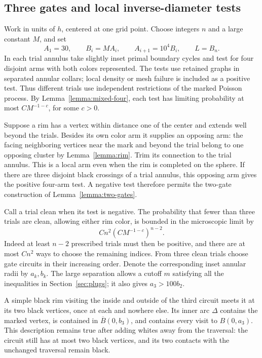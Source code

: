 \subsection{Three gates and local inverse-diameter tests}

Work in units of $h$, centered at one grid point.  Choose integers $n$
and a large constant $M$, and set
\[
 A_1=30,\qquad B_i=MA_i,\qquad A_{i+1}=10^4B_i,
 \qquad L=B_n.
\]
In each trial annulus take slightly inset primal boundary cycles and
test for four disjoint arms with both colors represented.  The tests use
retained graphs in separated annular collars; local density or mesh
failure is included as a positive test.  Thus different trials use
independent restrictions of the marked Poisson process.  By
Lemma~\ref{lemma:mixed-four}, each test has limiting probability at most
$CM^{-1-c}$, for some $c>0$.

Suppose a rim has a vertex within distance one of the center and extends
well beyond the trials.  Besides its own color arm it supplies an
opposing arm: the facing neighboring vertices near the mark and beyond
the trial belong to one opposing cluster by Lemma~\ref{lemma:rim}.
Trim its connection to the trial annulus.  This is a local arm even when
the rim is completed on the sphere.  If there are three disjoint black
crossings of a trial annulus, this opposing arm gives the positive
four-arm test.  A negative test therefore permits the two-gate
construction of Lemma~\ref{lemma:two-gates}.

Call a trial clean when its test is negative.  The probability that fewer
than three trials are clean, allowing either rim color, is bounded in
the microscopic limit by
\begin{equation}\label{pin:trials}
                   Cn^2(CM^{-1-c})^{n-2}.
\end{equation}
Indeed at least $n-2$ prescribed trials must then be positive, and there
are at most $Cn^2$ ways to choose the remaining indices.  From three
clean trials choose gate circuits in their increasing order.  Denote the
corresponding inset annular radii by $a_k,b_k$.  The large separation
allows a cutoff $m$ satisfying all the inequalities in
Section~\ref{sec:plugs}; it also gives $a_3>100b_2$.

A simple black rim visiting the inside and outside of the third circuit
meets it at its two black vertices, once at each and nowhere else.  Its
inner arc $\Delta$ contains the marked vertex, is contained in
$\overline B(0,b_3)$, and contains every visit to $B(0,a_3)$.  This
description remains true after adding whites away from the traversal:
the circuit still has at most two black vertices, and its two contacts
with the unchanged traversal remain black.

